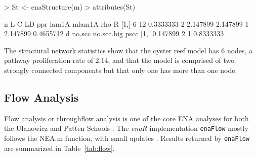 \documentclass[11pt]{article}
\begin{document}
\begin{Schunk}
\begin{Sinput}
> St <- enaStructure(m)
> attributes(St)
\end{Sinput}
\begin{Soutput}
     n  L         C LD      ppr    lam1A mlam1A      rho         R
[1,] 6 12 0.3333333  2 2.147899 2.147899      1 2.147899 0.4655712
            d no.scc no.scc.big      pscc
[1,] 0.147899      2          1 0.8333333
\end{Soutput}
\end{Schunk}

The structural network statistics show that the oyster reef model has
6 nodes, a pathway proliferation rate of 2.14, and that the model is
comprised of two strongly connected components but that only one has
more than one node.  

\subsection{Flow Analysis}
Flow analysis or throughflow analysis is one of the core ENA analyses
for both the Ulanowicz and Patten Schools \citep{fath99_review,
  fath06, schramski11}.  The \textit{enaR} implementation
\texttt{enaFlow} mostly follows the NEA.m function, with small updates
\cite[e.g. calculating the ratio of indirect-to-direct
flows][]{borrett11_ree,borrett11_equ}. Results returned by
\texttt{enaFlow} are summarized in Table~\ref{tab:flow}.
\end{document}
